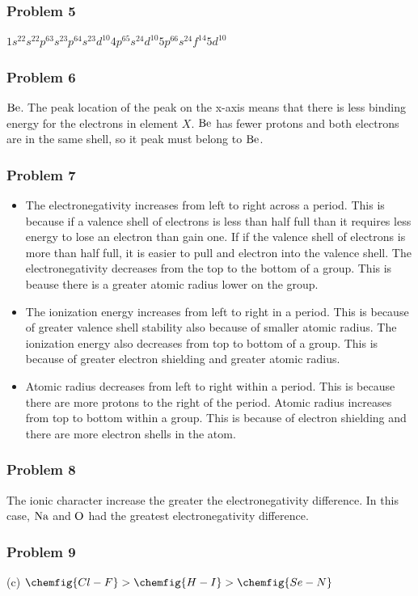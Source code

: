 \documentclass{article}
\begin{document}
\subsubsection*{Problem 5}
\(1s^22s^22p^63s^23p^64s^23d^{10}4p^65s^24d^{10}5p^66s^24f^{14}5d^{10}\)
\subsubsection*{Problem 6}
\(\ce{Be}\). The peak location of the peak on the x-axis means that there is less binding energy for the electrons in element \(X\). \(\ce{Be}\) has fewer protons
and both electrons are in the same shell, so it peak must belong to \(\ce{Be}\).
\subsubsection*{Problem 7}
\begin{itemize}
\item The electronegativity increases from left to right across a period. This is because if a valence shell of electrons is less than half full than
it requires less energy to lose an electron than gain one. If if the valence shell of electrons is more than half full, it is easier to pull and electron
into the valence shell. The electronegativity decreases from the top to the bottom of a group. This is beause there is a greater atomic radius lower on the group.

\item The ionization energy increases from left to right in a period. This is because of greater valence shell stability also because of smaller atomic radius. The ionization energy also decreases
from top to bottom of a group. This is because of greater electron shielding and greater atomic radius. 

\item Atomic radius decreases from left to right within a period. This is because there are more protons to the right of the period. Atomic radius increases from top to bottom within a group.
 This is because of electron shielding and there are more electron shells in the atom. 
\end{itemize}  
\subsubsection*{Problem 8}
The ionic character increase the greater the electronegativity difference. In this case, \(\ce{Na}\) and \(\ce{O}\) had the greatest electronegativity difference. 
\subsubsection*{Problem 9}
(c) \(\chemfig{Cl-F} > \chemfig{H-I} > \chemfig{Se-N}\)
\end{document}
